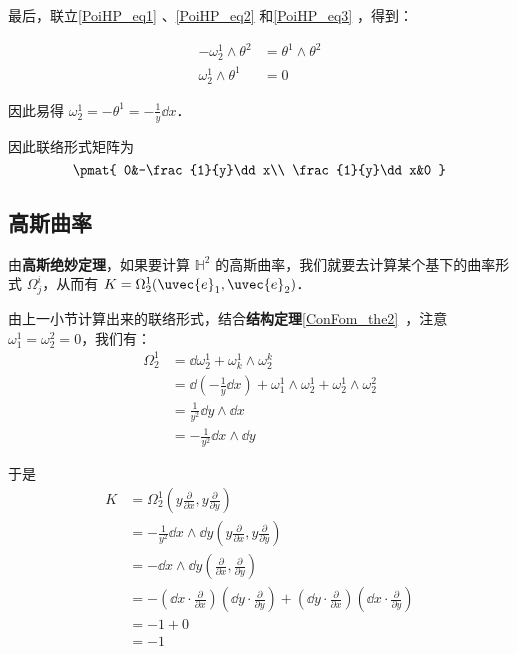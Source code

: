最后，联立\autoref{PoiHP_eq1} 、\autoref{PoiHP_eq2} 和\autoref{PoiHP_eq3} ，得到：

\begin{equation}
\begin{aligned}
-\omega^1_2\wedge\theta^2&=\theta^1\wedge\theta^2\\
\omega^1_2\wedge\theta^1&=0
\end{aligned}
\end{equation}

因此易得 $\omega^1_2=-\theta^1=-\frac{1}{y}\dd x$．

因此联络形式矩阵为
\begin{equation}
\pmat{
    0&-\frac{1}{y}\dd x\\
    \frac{1}{y}\dd x&0
}
\end{equation}

\subsection{高斯曲率}


由\textbf{高斯绝妙定理}，如果要计算 $\mathbb{H}^2$ 的高斯曲率，我们就要去计算某个基下的曲率形式 $\Omega^i_j$，从而有 $K=\Omega^1_2(\uvec{e}_1, \uvec{e}_2)$．

由上一小节计算出来的联络形式，结合\textbf{结构定理}\autoref{ConFom_the2}~，注意 $\omega^1_1=\omega^2_2=0$，我们有：
\begin{equation}
\begin{aligned}
\Omega^1_2&=\dd \omega^1_2+\omega^1_k\wedge\omega^k_2\\
&=\dd(-\frac{1}{y}\dd x)+\omega^1_1\wedge\omega^1_2+\omega^1_2\wedge\omega^2_2\\
&=\frac{1}{y^2}\dd y\wedge\dd x\\
&=-\frac{1}{y^2}\dd x\wedge \dd y
\end{aligned}
\end{equation}

于是
\begin{equation}
\begin{aligned}
K&=\Omega^1_2(y\frac{\partial}{\partial x}, y\frac{\partial}{\partial y})\\
&=-\frac{1}{y^2}\dd x\wedge \dd y(y\frac{\partial}{\partial x}, y\frac{\partial}{\partial y})\\
&=-\dd x\wedge \dd y(\frac{\partial}{\partial x}, \frac{\partial}{\partial y})\\
&=-(\dd x\cdot \frac{\partial}{\partial x})(\dd y\cdot \frac{\partial}{\partial y})+(\dd y\cdot \frac{\partial}{\partial x})(\dd x\cdot \frac{\partial}{\partial y})\\
&=-1+0\\
&=-1
\end{aligned}
\end{equation}

